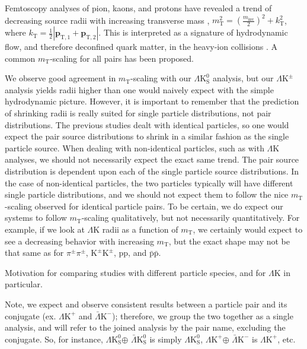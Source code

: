 \documentclass[ALICE,manyauthors]{cernphprep}
\newcommand{\mt}{$m_{\mathrm{T}}$\xspace}
\newcommand{\LamK}{$\Lambda$K\xspace}
\newcommand{\LamKchP}{$\Lambda\mathrm{K^{+}}$\xspace}
\newcommand{\ALamKchM}{$\bar{\Lambda}\mathrm{K^{-}}$\xspace}
\newcommand{\LamKpm}{$\Lambda\mathrm{K^{\pm}}$\xspace}
\newcommand{\LamKs}{$\Lambda\mathrm{K^{0}_{S}}$\xspace}
\newcommand{\ALamKs}{$\bar{\Lambda}\mathrm{K^{0}_{S}}$\xspace}
\begin{document}
Femtoscopy analyses of pion, kaons, and protons have revealed a trend of decreasing source radii with increasing transverse mass \cite{Adam:2015vja}, $m_{\mathrm{T}}^{2} = (\frac{m_{\mathrm{inv}}}{2})^{2} + k_{\mathrm{T}}^{2}$, where $k_{\mathrm{T}} = \frac{1}{2}|\mathbf{p}_{\mathrm{T},1} + \mathbf{p}_{\mathrm{T},2}|$.  This is interpreted as a signature of hydrodynamic flow, and therefore deconfined quark matter, in the heavy-ion collisions \cite{Akkelin:1995gh}. A common \mt-scaling for all pairs has been proposed.

We observe good agreement in \mt-scaling with our \LamKs analysis, but our \LamKpm analysis yields radii higher than one would naively expect with the simple hydrodynamic picture.  
However, it is important to remember that the prediction of shrinking radii is really suited for single particle distributions, not pair distributions.  
The previous studies dealt with identical particles, so one would expect the pair source distributions to shrink in a similar fashion as the single particle source.  
When dealing with non-identical particles, such as with \LamK analyses, we should not necessarily expect the exact same trend. 
The pair source distribution is dependent upon each of the single particle source distributions.
In the case of non-identical particles, the two particles typically will have different single particle distributions, and we should not expect them to follow the nice \mt-scaling observed for identical particle pairs.
To be certain, we do expect our systems to follow \mt-scaling qualitatively, but not necessarily quantitatively.
For example, if we look at \LamK radii as a function of \mt, we certainly would expect to see a decreasing behavior with increasing \mt, but the exact shape may not be that same as for $\pi^{\pm}\pi^{\pm}$, $\mathrm{K}^{\pm}\mathrm{K}^{\pm}$, pp, and $\bar{\mathrm{p}}\bar{\mathrm{p}}$.

Motivation for comparing studies with different particle species, and for \LamK in particular.

Note, we expect and observe consistent results between a particle pair and its conjugate (ex. \LamKchP and \ALamKchM); therefore, we group the two together as a single analysis, and will refer to the joined analysis by the pair name, excluding the conjugate.  
So, for instance, \LamKs $\oplus$ \ALamKs is simply \LamKs, \LamKchP $\oplus$ \ALamKchM is \LamKchP, etc. 
\end{document}
